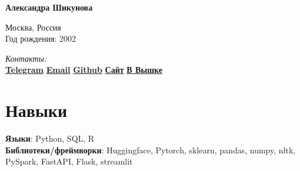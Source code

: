 \documentclass[11pt]{article} %
\begin{document}


{\LARGE\bfseries Александра Шикунова} %
\bigskip\bigskip\medskip %

\begin{minipage}[t]{0.35\linewidth}
Москва, Россия\\
Год рождения: 2002\\
\end{minipage}
\begin{minipage}[t]{0.55\linewidth}
\textit{Контакты:}\\
\textbf{\href{https://t.me/thnlgrlivrlvdwsbrnwthrssnhrys}{Telegram}} \hspace*{2em}
\textbf{\href{mailto:notalexandrashikunova@gmail.com}{Email}} \hspace*{2em}
\textbf{\href{https://github.com/poisongrapevine}{Github}} \hspace*{2em}
\textbf{\href{https://thddbptnsndshs.github.io/academic_site/}{Сайт}} \hspace*{2em}
\textbf{\href{https://www.hse.ru/org/persons/401664223}{В Вышке}}
\medskip %

\end{minipage}

\section*{Навыки}

\textbf{Языки}: Python, SQL, R\\
\textbf{Библиотеки/фреймворки}: Huggingface, Pytorch, sklearn, pandas, numpy, nltk, PySpark, FastAPI, Flask, streamlit
%

\end{document}
